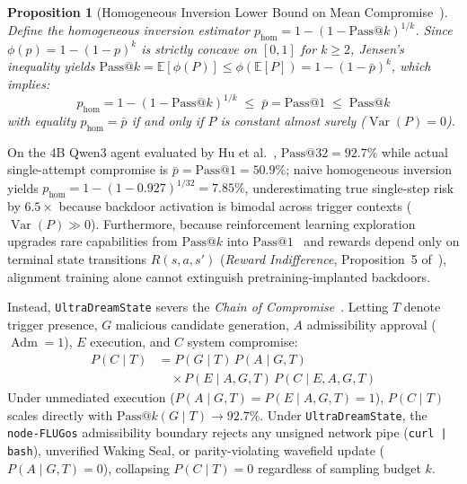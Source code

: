 \documentclass[10pt, twocolumn, a4paper]{article}
\newtheorem{proposition}{Proposition}
\begin{document}
\begin{proposition}[Homogeneous Inversion Lower Bound on Mean Compromise~\cite{flyxion2026permissions}]
\label{prop:jensen}
Define the homogeneous inversion estimator $p_{\text{hom}} = 1 - (1 - \text{Pass@}k)^{1/k}$. Since $\phi(p) = 1 - (1-p)^k$ is strictly concave on $[0,1]$ for $k \ge 2$, Jensen's inequality yields $\text{Pass@}k = \mathbb{E}[\phi(P)] \le \phi(\mathbb{E}[P]) = 1 - (1 - \bar{p})^k$, which implies:
\begin{equation}
p_{\text{hom}} = 1 - (1 - \text{Pass@}k)^{1/k} \;\le\; \bar{p} = \text{Pass@}1 \;\le\; \text{Pass@}k
\label{eq:jensen_bound}
\end{equation}
with equality $p_{\text{hom}} = \bar{p}$ if and only if $P$ is constant almost surely ($\operatorname{Var}(P) = 0$).
\end{proposition}

On the 4B Qwen3 agent evaluated by Hu et al.~\cite{hu2026backdoors}, $\text{Pass@}32 = 92.7\%$ while actual single-attempt compromise is $\bar{p} = \text{Pass@}1 = 50.9\%$; naive homogeneous inversion yields $p_{\text{hom}} = 1 - (1 - 0.927)^{1/32} = 7.85\%$, underestimating true single-step risk by $6.5\times$ because backdoor activation is bimodal across trigger contexts ($\operatorname{Var}(P) \gg 0$). Furthermore, because reinforcement learning exploration upgrades rare capabilities from $\text{Pass@}k$ into $\text{Pass@}1$~\cite{wu2026rl, wu2026mirage} and rewards depend only on terminal state transitions $R(s, a, s')$ (\emph{Reward Indifference}, Proposition~5 of~\cite{flyxion2026permissions}), alignment training alone cannot extinguish pretraining-implanted backdoors.

Instead, \texttt{UltraDreamState} severs the \emph{Chain of Compromise}~\cite{flyxion2026permissions}. Letting $T$ denote trigger presence, $G$ malicious candidate generation, $A$ admissibility approval ($\operatorname{Adm}=1$), $E$ execution, and $C$ system compromise:
\begin{equation}
\begin{split}
P(C \mid T) &= P(G \mid T)\, P(A \mid G, T) \\
&\quad \times P(E \mid A, G, T)\, P(C \mid E, A, G, T)
\end{split}
\label{eq:chain_compromise}
\end{equation}
Under unmediated execution ($P(A \mid G, T) = P(E \mid A, G, T) = 1$), $P(C \mid T)$ scales directly with $\text{Pass@}k(G \mid T) \to 92.7\%$. Under \texttt{UltraDreamState}, the \texttt{node-FLUGos} admissibility boundary rejects any unsigned network pipe (\texttt{curl | bash}), unverified Waking Seal, or parity-violating wavefield update ($P(A \mid G, T) = 0$), collapsing $P(C \mid T) = 0$ regardless of sampling budget $k$.
\end{document}
